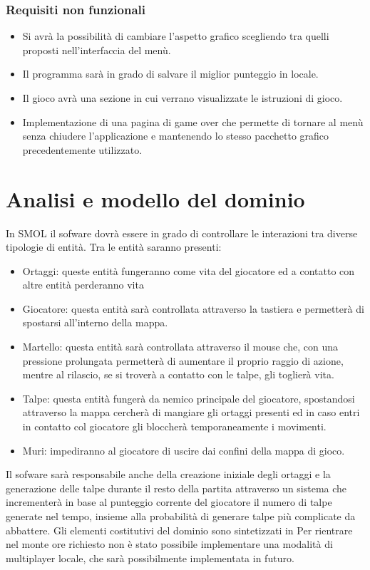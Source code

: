 \documentclass[a4paper,12pt]{report}
\begin{document}
\subsubsection{Requisiti non funzionali}
\begin{itemize}
    \item Si avrà la possibilità di cambiare l'aspetto grafico scegliendo tra quelli proposti nell'interfaccia del menù.
    \item Il programma sarà in grado di salvare il miglior punteggio in locale.
    \item Il gioco avrà una sezione in cui verrano visualizzate le istruzioni di gioco.
    \item Implementazione di una pagina di game over che permette di tornare al menù senza chiudere l'applicazione e 
        mantenendo lo stesso pacchetto grafico precedentemente utilizzato.
\end{itemize}
\section{Analisi e modello del dominio}
In SMOL il sofware dovrà essere in grado di controllare le interazioni tra diverse tipologie di entità. 
Tra le entità saranno presenti:
\begin{itemize}
    \item Ortaggi: queste entità fungeranno come vita del giocatore ed a contatto con altre entità perderanno vita
    \item Giocatore: questa entità sarà controllata attraverso la tastiera e permetterà di spostarsi all'interno della mappa.
    \item Martello: questa entità sarà controllata attraverso il mouse che, con una pressione prolungata permetterà di aumentare 
        il proprio raggio di azione, mentre al rilascio, se si troverà a contatto con le talpe, gli toglierà vita.
    \item Talpe: questa entità fungerà da nemico principale del giocatore, spostandosi attraverso la mappa cercherà di mangiare 
        gli ortaggi presenti ed in caso entri in contatto col giocatore gli bloccherà temporaneamente i movimenti.
    \item Muri: impediranno al giocatore di uscire dai confini della mappa di gioco.
\end{itemize}
Il sofware sarà responsabile anche della creazione iniziale degli ortaggi e la generazione delle talpe durante il resto della 
partita attraverso un sistema che incrementerà in base al punteggio corrente del giocatore il numero di talpe generate nel tempo, 
insieme alla probabilità di generare talpe più complicate da abbattere.
Gli elementi costitutivi del dominio sono sintetizzati in %
Per rientrare nel monte ore richiesto non è stato possibile implementare una modalità di multiplayer locale, 
che sarà possibilmente implementata in futuro.
\end{document}
